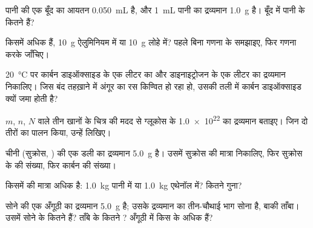 \begin{exercise}[$\star\star$]\label{exo:g10:the-mole:6}
पानी की एक बूँद का आयतन \qty{0.050}{mL} है, और \qty{1}{mL} पानी का
द्रव्यमान \qty{1.0}{g} है। बूँद में पानी के कितने 
हैं?
\end{exercise}

\begin{exercise}[$\star\star$]\label{exo:g10:the-mole:7}
किसमें अधिक  हैं, \qty{10}{g} ऐलुमिनियम में या \qty{10}{g}
लोहे में? पहले बिना गणना के समझाइए, फिर गणना करके जाँचिए।
\end{exercise}

\begin{exercise}[$\star\star$]\label{exo:g10:the-mole:8}
\qty{20}{\celsius} पर कार्बन डाइऑक्साइड के एक लीटर का और डाइनाइट्रोजन के एक लीटर
का द्रव्यमान निकालिए। जिस बंद तहख़ाने में अंगूर का रस किण्वित हो रहा हो, उसकी तली
में कार्बन डाइऑक्साइड क्यों जमा होती है?
\end{exercise}

\begin{exercise}[$\star\star$]\label{exo:g10:the-mole:9}
$m$, $n$, $N$ वाले तीन खानों के चित्र की मदद से ग्लूकोस  के
\num{1.0e22}  का द्रव्यमान बताइए। जिन दो
तीरों का पालन किया, उन्हें लिखिए।
\end{exercise}

\begin{exercise}[$\star\star$]\label{exo:g10:the-mole:10}
चीनी (सुक्रोस, ) की एक डली का द्रव्यमान \qty{5.0}{g} है।
उसमें सुक्रोस की मात्रा निकालिए, फिर सुक्रोस के  की संख्या, फिर
कार्बन  की संख्या।
\end{exercise}

\begin{exercise}[$\star\star$]\label{exo:g10:the-mole:11}
किसमें  की मात्रा अधिक है: \qty{1.0}{kg} पानी
 में या \qty{1.0}{kg} एथेनॉल  में? कितने गुना?
\end{exercise}

\begin{exercise}[$\star\star\star$]\label{exo:g10:the-mole:12}
सोने की एक अँगूठी का द्रव्यमान \qty{5.0}{g} है; उसके द्रव्यमान का तीन-चौथाई भाग
सोना है, बाकी ताँबा। उसमें सोने के कितने  हैं? ताँबे के कितने
? अँगूठी में किस  के  अधिक हैं?
\end{exercise}

